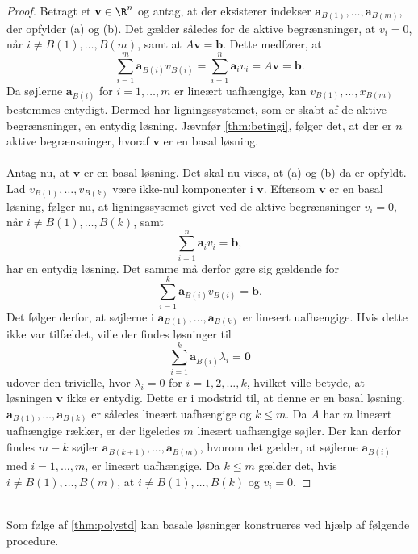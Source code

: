\begin{proof}
Betragt et $\textbf{v} \in \R^n$ og antag, at der eksisterer indekser $\mathbf{a}_{B(1)},\ldots,\mathbf{a}_{B(m)}$, der opfylder (a) og (b).
%
Det gælder således for de aktive begrænsninger, at $v_i=0$, når $i\neq B(1),\ldots,B(m)$, samt at $A\textbf{v}=\mathbf{b}$.
Dette medfører, at 
%
$$\sum_{i=1}^{m}\textbf{a}_{B(i)}v_{B(i)}=\sum_{i=1}^{n}\textbf{a}_i v_i=A\textbf{v}=\textbf{b}.$$
%
Da søjlerne $\textbf{a}_{B(i)}$ for $i=1,\ldots,m$ er lineært uafhængige, kan $v_{B(1)},\ldots,x_{B(m)}$ bestemmes entydigt. 
Dermed har ligningssystemet, som er skabt af de aktive begrænsninger, en entydig løsning.
Jævnfør \ref{thm:betingi},
følger det, at der er $n$ aktive begrænsninger, hvoraf $\mathbf{v}$ er en basal løsning. 
\\\\
%
%
Antag nu, at $\mathbf{v}$ er en basal løsning. 
Det skal nu vises, at (a) og (b) da er opfyldt.
Lad $v_{B(1)},\ldots,v_{B(k)}$ være ikke-nul komponenter i $\textbf{v}$.
Eftersom $\mathbf{v}$ er en basal løsning, følger nu, at ligningssysemet givet ved de aktive begrænsninger $v_i=0$, når $i\neq B(1),\ldots,B(k)$, samt  $$\sum_{i=1}^{n}\mathbf{a}_i v_i=\mathbf{b},$$ har en entydig løsning. 
Det samme må derfor gøre sig gældende for $$\sum_{i=1}^{k}\mathbf{a}_{B(i)}v_{B(i)}=\mathbf{b}.$$
Det følger derfor, at søjlerne i $\textbf{a}_{B(1)},\ldots,\textbf{a}_{B(k)}$ er lineært uafhængige.
%
Hvis dette ikke var tilfældet, ville der findes løsninger til $$\sum_{i=1}^{k}\mathbf{a}_{B(i)} \lambda_i=\mathbf{0}$$ udover den trivielle, hvor $\lambda_i=0$ for $i=1,2,\ldots,k$, hvilket ville betyde, at løsningen $\mathbf{v}$ ikke er entydig. 
Dette er i modstrid til, at denne er en basal løsning.
$\mathbf{a}_{B(1)},\ldots ,\mathbf{a}_{B(k)}$ er således lineært uafhængige og $k \leq m$.
Da $A$ har $m$ lineært uafhængige rækker, er der ligeledes $m$ lineært uafhængige søjler.
Der kan derfor findes $m-k$ søjler $\textbf{a}_{B(k+1)},\ldots,\textbf{a}_{B(m)}$, hvorom det gælder, at søjlerne $\mathbf{a}_{B(i)}$ med $i=1,\ldots,m$, er lineært uafhængige.
Da $k \leq m$ gælder det, hvis $i \neq B(1),\ldots,B(m)$, at $i \neq B(1),\ldots,B(k)$ og $v_i=0$.
%
\end{proof}
\\
\noindent
Som følge af \ref{thm:polystd} kan basale løsninger konstrueres ved hjælp af følgende procedure.
